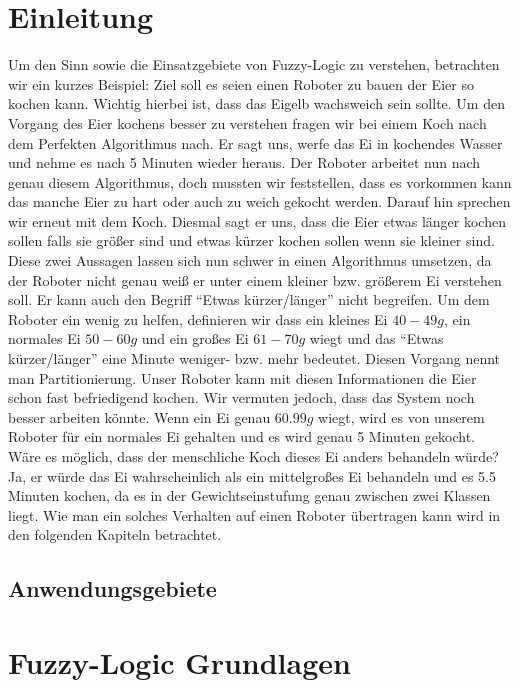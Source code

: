 \documentclass[12pt,a4paper,bibliography=totocnumbered,listof=totocnumbered]{scrartcl}
\theoremstyle{Umgebung}
\begin{document}
\section{Einleitung}

Um den Sinn sowie die Einsatzgebiete von Fuzzy-Logic zu verstehen, betrachten wir ein kurzes Beispiel: Ziel soll es seien einen Roboter zu bauen der Eier so kochen kann. Wichtig hierbei ist, dass das Eigelb wachsweich sein sollte. Um den Vorgang des Eier kochens besser zu verstehen fragen wir bei einem Koch nach dem Perfekten Algorithmus nach. Er sagt uns, werfe das Ei in kochendes Wasser und nehme es nach 5 Minuten wieder heraus. Der Roboter arbeitet nun nach genau diesem Algorithmus, doch mussten wir feststellen, dass es vorkommen kann das manche Eier zu hart oder auch zu weich gekocht werden. Darauf hin sprechen wir erneut mit dem Koch. Diesmal sagt er uns, dass die Eier etwas länger kochen sollen falls sie größer sind und etwas kürzer kochen sollen wenn sie kleiner sind. Diese zwei Aussagen lassen sich nun schwer in einen Algorithmus umsetzen, da der Roboter nicht genau weiß er unter einem kleiner bzw. größerem Ei verstehen soll. Er kann auch den Begriff \enquote{Etwas kürzer/länger} nicht begreifen. Um dem Roboter ein wenig zu helfen, definieren wir dass ein kleines Ei $40-49g$, ein normales Ei $50-60g$ und ein großes Ei $61-70g$ wiegt und das \enquote{Etwas kürzer/länger} eine Minute weniger- bzw. mehr bedeutet. Diesen Vorgang nennt man Partitionierung. Unser Roboter kann mit diesen Informationen die Eier schon fast befriedigend kochen. Wir vermuten jedoch, dass das System noch besser arbeiten könnte. Wenn ein Ei genau $60.99g$ wiegt, wird es von unserem Roboter für ein normales Ei gehalten und es wird genau 5 Minuten gekocht. Wäre es möglich, dass der menschliche Koch dieses Ei anders behandeln würde? Ja, er würde das Ei wahrscheinlich als ein mittelgroßes Ei behandeln und es 5.5 Minuten kochen, da es in der Gewichtseinstufung genau zwischen zwei Klassen liegt. Wie man ein solches Verhalten auf einen Roboter übertragen kann wird in den folgenden Kapiteln betrachtet.

\subsection{Anwendungsgebiete}

\section{Fuzzy-Logic Grundlagen}
\end{document}
